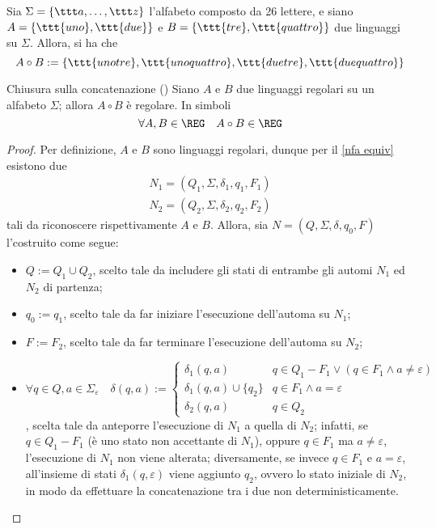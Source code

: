 \documentclass[a4paper, 12pt]{report}
\begin{document}
    \begin{example}[Concatenazione]
        Sia $\Sigma = \{\ttt a , \ldots, \ttt z\}$ l'alfabeto composto da 26 lettere, e siano $A = \{\ttt{uno}, \ttt{due}\}$ e $B = \{\ttt{tre}, \ttt{quattro}\}$ due linguaggi su $\Sigma$. Allora, si ha che $$A \circ B := \{\ttt{unotre}, \ttt{unoquattro}, \ttt{duetre}, \ttt{duequattro}\}$$
    \end{example}

    \begin{framedprop}[label={closure concat}]{Chiusura sulla concatenazione (\REG)}
        Siano $A$ e $B$ due linguaggi regolari su un alfabeto $\Sigma$; allora $A \circ B$ è regolare. In simboli $$\forall A, B \in \REG \quad A \circ B \in \REG$$
    \end{framedprop}

    \begin{proof}
        Per definizione, $A$ e $B$ sono linguaggi regolari, dunque per il \cref{nfa equiv} esistono due \NFA $$\left. \begin{array}{c}N_1 = (Q_1, \Sigma, \delta_1, q_1, F_1) \\ N_2 = (Q_2, \Sigma, \delta_2, q_2, F_2) \end{array} \right.$$ tali da riconoscere rispettivamente $A$ e $B$. Allora, sia $N = (Q, \Sigma, \delta, q_0, F)$ l'\NFA costruito come segue:
        
        \begin{itemize}
            \item $Q := Q_1 \cup Q_2$, scelto tale da includere gli stati di entrambe gli automi $N_1$ ed $N_2$ di partenza;
            \item $q_0 := q_1$, scelto tale da far iniziare l'esecuzione dell'automa su $N_1$;
            \item $F := F_2$, scelto tale da far terminare l'esecuzione dell'automa su $N_2$;
            \item $\forall q \in Q, a \in \Sigma_\varepsilon \quad \delta(q, a) := \left \{ \begin{array}{ll} \delta_1(q, a) & q \in Q_1 - F_1 \lor (q \in F_1 \land a \neq \varepsilon) \\ \delta_1(q, a) \cup \{q_2\} & q \in F_1 \land a = \varepsilon \\ \delta_2(q, a) & q \in Q_2 \end{array} \right.$, scelta tale da anteporre l'esecuzione di $N_1$ a quella di $N_2$; infatti, se $q \in Q_1 - F_1$ (è uno stato non accettante di $N_1$), oppure $q \in F_1$ ma $a \neq \varepsilon$, l'esecuzione di $N_1$ non viene alterata; diversamente, se invece $q \in F_1$ e $a = \varepsilon$, all'insieme di stati $\delta_1(q, \varepsilon)$ viene aggiunto $q_2$, ovvero lo stato iniziale di $N_2$, in modo da effettuare la concatenazione tra i due \NFA non deterministicamente.
        \end{itemize}


\end{proof}
\end{document}

